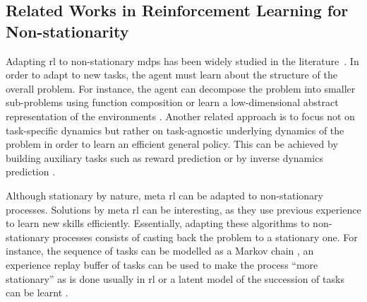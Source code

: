 \subsection{Related Works in Reinforcement Learning for Non-stationarity}
\label{subsec:related_worls_lifelong}

Adapting \gls{rl} to non-stationary \glspl{mdp} has been widely studied in the literature~\cite{garcia2000solving, ghate2013linear, lesner2015nonstationary}. 
In order to adapt to new tasks, the agent must learn about the structure of the overall problem. 
For instance, the agent can decompose the problem into smaller sub-problems using function composition \cite{griffiths2019subtasks} or learn a low-dimensional abstract representation of the environments \cite{zhang2018decoupling, Francois-Lavet2019abstract}.
Another related approach is to focus not on task-specific dynamics but rather on task-agnostic underlying dynamics of the problem in order to learn an efficient general policy. 
This can be achieved by building auxiliary tasks such as reward prediction \cite{jaderberg2017rew-pred} or by inverse dynamics prediction \cite{Shelhamer2017dyn-pred}.

Although stationary by nature, meta \gls{rl} can be adapted to non-stationary processes. 
Solutions by meta \gls{rl} can be interesting, as they use previous experience to learn new skills efficiently.
Essentially, adapting these algorithms to non-stationary processes consists of casting back the problem to a stationary one.  
For instance, the sequence of tasks can be modelled as a Markov chain \cite{al-shedivat2018continuous}, an experience replay buffer of tasks can be used to make the process ``more stationary'' \cite{riemer2018learning} as is done usually in \gls{rl} \cite{mnih2013playing} or a latent model of the succession of tasks can be learnt \cite{poiani2021meta}.

